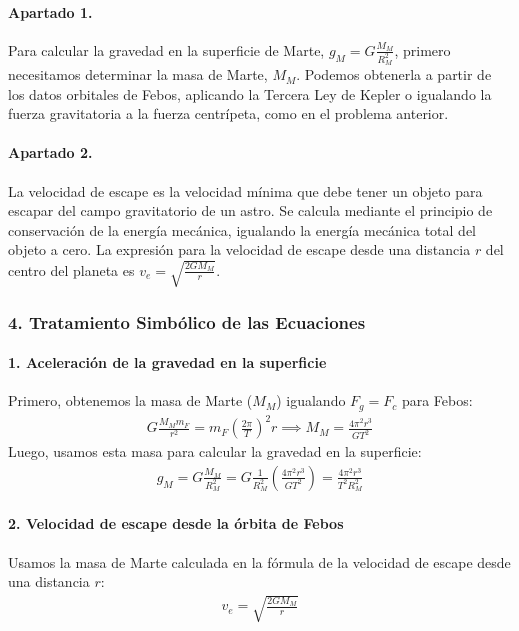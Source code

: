 \paragraph{Apartado 1.} Para calcular la gravedad en la superficie de Marte, $g_M = G \frac{M_M}{R_M^2}$, primero necesitamos determinar la masa de Marte, $M_M$. Podemos obtenerla a partir de los datos orbitales de Febos, aplicando la Tercera Ley de Kepler o igualando la fuerza gravitatoria a la fuerza centrípeta, como en el problema anterior.

\paragraph{Apartado 2.} La velocidad de escape es la velocidad mínima que debe tener un objeto para escapar del campo gravitatorio de un astro. Se calcula mediante el principio de conservación de la energía mecánica, igualando la energía mecánica total del objeto a cero. La expresión para la velocidad de escape desde una distancia $r$ del centro del planeta es $v_e = \sqrt{\frac{2GM_M}{r}}$.

\subsubsection*{4. Tratamiento Simbólico de las Ecuaciones}
\paragraph{1. Aceleración de la gravedad en la superficie}
Primero, obtenemos la masa de Marte ($M_M$) igualando $F_g=F_c$ para Febos:
\begin{gather}
    G \frac{M_M m_F}{r^2} = m_F \left(\frac{2\pi}{T}\right)^2 r \implies M_M = \frac{4\pi^2 r^3}{G T^2}
\end{gather}
Luego, usamos esta masa para calcular la gravedad en la superficie:
\begin{gather}
    g_M = G \frac{M_M}{R_M^2} = G \frac{1}{R_M^2} \left( \frac{4\pi^2 r^3}{G T^2} \right) = \frac{4\pi^2 r^3}{T^2 R_M^2}
\end{gather}

\paragraph{2. Velocidad de escape desde la órbita de Febos}
Usamos la masa de Marte calculada en la fórmula de la velocidad de escape desde una distancia $r$:
\begin{gather}
    v_e = \sqrt{\frac{2GM_M}{r}}
\end{gather}

